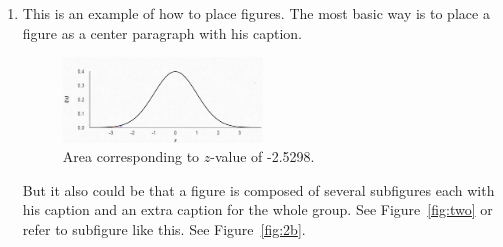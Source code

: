 \begin{enumerate}
 \item This is an example of how to place figures. The most basic way is to place a figure as a center paragraph with his caption.
 
 
\begin{figure}[htb]
  \centering
  \label{fig:one}
  \includegraphics[width=0.5\textwidth]{img/normal}
  \caption{Area corresponding to $z$-value of -2.5298.}
\end{figure}

But it also could be that a figure is composed of several subfigures each with his caption and an extra caption for the whole group. See Figure~\ref{fig:two} or refer to subfigure like this. See Figure~\ref{fig:2b}.


\end{enumerate}
